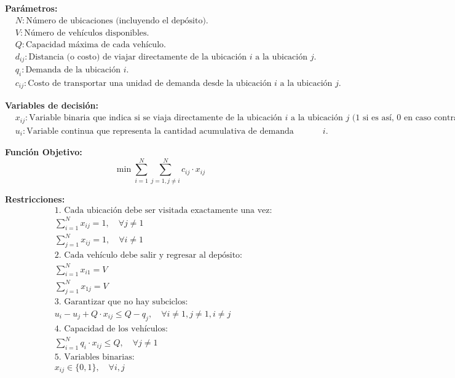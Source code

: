 \documentclass{article}
\begin{document}
\textbf{Parámetros:}
\begin{align*}
&N: \text{Número de ubicaciones (incluyendo el depósito).} \\
&V: \text{Número de vehículos disponibles.} \\
&Q: \text{Capacidad máxima de cada vehículo.} \\
&d_{ij}: \text{Distancia (o costo) de viajar directamente de la ubicación } i \text{ a la ubicación } j. \\
&q_i: \text{Demanda de la ubicación } i. \\
&c_{ij}: \text{Costo de transportar una unidad de demanda desde la ubicación } i \text{ a la ubicación } j.
\end{align*}

\textbf{Variables de decisión:}
\begin{align*}
&x_{ij}: \text{Variable binaria que indica si se viaja directamente de la ubicación } i \text{ a la ubicación } j \text{ (1 si es así, 0 en caso contrario).} \\
&u_i: \text{Variable continua que representa la cantidad acumulativa de demanda atendida en la ubicación } i.
\end{align*}

\textbf{Función Objetivo:}
\[\min \sum_{i=1}^{N}\sum_{j=1, j\neq i}^{N} c_{ij} \cdot x_{ij}\]

\textbf{Restricciones:}
\begin{align*}
&\text{1. Cada ubicación debe ser visitada exactamente una vez:} \\
&\sum_{i=1}^{N} x_{ij} = 1, \quad \forall j \neq 1 \\
&\sum_{j=1}^{N} x_{ij} = 1, \quad \forall i \neq 1 \\
&\text{2. Cada vehículo debe salir y regresar al depósito:} \\
&\sum_{i=1}^{N} x_{i1} = V \\
&\sum_{j=1}^{N} x_{1j} = V \\
&\text{3. Garantizar que no hay subciclos:} \\
&u_i - u_j + Q \cdot x_{ij} \leq Q - q_j, \quad \forall i \neq 1, j \neq 1, i \neq j \\
&\text{4. Capacidad de los vehículos:} \\
&\sum_{i=1}^{N} q_i \cdot x_{ij} \leq Q, \quad \forall j \neq 1 \\
&\text{5. Variables binarias:} \\
&x_{ij} \in \{0, 1\}, \quad \forall i, j
\end{align*}
\end{document}
